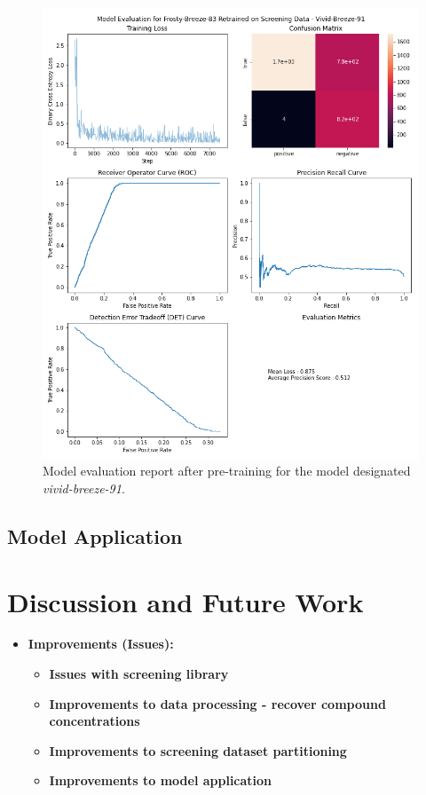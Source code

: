 \documentclass[16pt]{book}
\begin{document}
\begin{figure}
	\caption{\label{vividbreeze} Model evaluation report after pre-training for the model designated \textit{vivid-breeze-91}.}
	\includegraphics[width = \textwidth]{img/frosty-breeze-83-vivid-breeze-91-eval.png}
\end{figure}
\subsection{Model Application}
\section{Discussion and Future Work}

\begin{itemize}
	\item \textbf{Improvements (Issues):}
	\begin{itemize}
		\item \textbf{Issues with screening library}
		\item \textbf{Improvements to data processing - recover compound concentrations}
		\item \textbf{Improvements to screening dataset partitioning}
		\item \textbf{Improvements to model application}
	\end{itemize}
\end{itemize}
\end{document}
